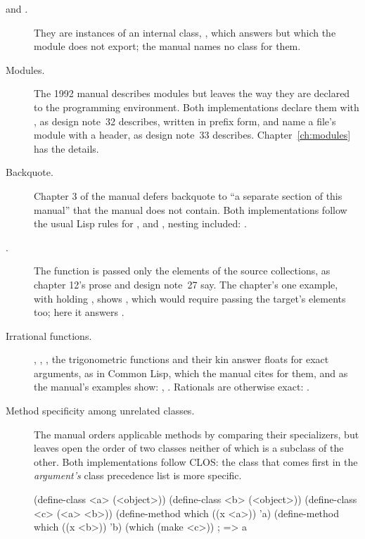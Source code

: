 \begin{description}
\item[ and .] They are instances of an internal
  class, , which  answers but which
  the  module does not export; the manual names no class for
  them.
\item[Modules.] 
  The 1992 manual describes modules but leaves the way they are declared
  to the programming environment. Both implementations declare them with
  , as design note~32 describes, written in prefix
  form, and name a file's module with a  header, as design
  note~33 describes. Chapter~\ref{ch:modules} has the details.

\item[Backquote.] 
  Chapter 3 of the manual defers backquote to ``a separate section of
  this manual'' that the manual does not contain. Both implementations
  follow the usual Lisp rules for , \code{,} and ,
  nesting included:  \yields{}
  .

\item[.] 
  The function is passed only the elements of the source collections, as
  chapter 12's prose and design note~27 say. The chapter's one example,
   with  holding
  , shows , which would
  require passing the target's elements too; here it answers
  .

\item[Irrational functions.]
  , , , the trigonometric functions and
  their kin answer floats for exact arguments, as in Common Lisp, which
  the manual cites for them, and as the manual's examples show:
   \yields{} ,  \yields{}
  . Rationals are otherwise exact:  \yields{}
  .

\item[Method specificity among unrelated classes.]
  The manual orders applicable methods by comparing their specializers,
  but leaves open the order of two classes neither of which is a
  subclass of the other. Both implementations follow CLOS: the class
  that comes first in the \emph{argument's} class precedence list is
  more specific.
\begin{dylan}
(define-class <a> (<object>))
(define-class <b> (<object>))
(define-class <c> (<a> <b>))
(define-method which ((x <a>)) 'a)
(define-method which ((x <b>)) 'b)
(which (make <c>))                 ; => a
\end{dylan}
\end{description}

